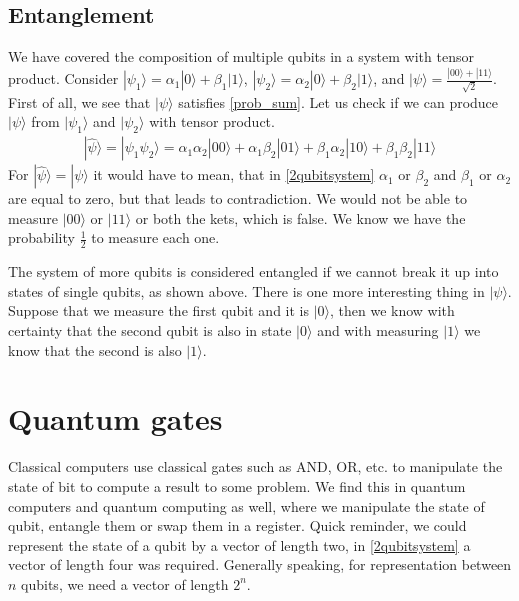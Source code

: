 \subsection{Entanglement}
We have covered the composition of multiple qubits in a system with tensor product. Consider $|\psi_1\rangle = \alpha_1 |0\rangle +\beta_1 |1\rangle$, $ |\psi_2\rangle = \alpha_2 |0\rangle +\beta_2 |1\rangle$, and $|\psi \rangle = \frac{|00 \rangle + |11 \rangle }{\sqrt{2}} $. First of all, we see that $| \psi \rangle$ satisfies \ref{prob_sum}. Let us check if we can produce $| \psi \rangle$ from $| \psi_1 \rangle$ and $| \psi_2 \rangle$ with tensor product.
\begin{equation} \label{2qubitsystem}
  \begin{aligned}
    |\widehat{\psi}\rangle = |\psi_1 \psi_2 \rangle = 
    \alpha_1 \alpha_2 |00\rangle +
    \alpha_1 \beta_2 |01\rangle +
    \beta_1 \alpha_2 |10\rangle +
    \beta_1 \beta_2 |11\rangle
    \end{aligned}
\end{equation}
For $|\widehat{\psi}\rangle = |\psi\rangle$ it would have to mean, that in \ref{2qubitsystem} $\alpha_1$ or $\beta_2$ and $\beta_1$ or $\alpha_2$ are equal to zero, but that leads to contradiction. We would not be able to measure $|00\rangle$ or $|11\rangle$ or both the kets, which is false. We know we have the probability $\frac{1}{2}$ to measure each one. 

The system of more qubits is considered entangled if we cannot break it up into states of single qubits, as shown above. There is one more interesting thing in $| \psi \rangle$. Suppose that we measure the first qubit and it is $|0\rangle$, then we know with certainty that the second qubit is also in state $|0\rangle$ and with measuring $|1\rangle$ we know that the second is also $|1\rangle$. 

\section{Quantum gates}

Classical computers use classical gates such as AND, OR, etc. to manipulate the state of bit to compute a result to some problem. We find this in quantum computers and quantum computing as well, where we manipulate the state of qubit, entangle them or swap them in a register. 
Quick reminder, we could represent the state of a qubit by a vector of length two, in \ref{2qubitsystem} a vector of length four was required. Generally speaking, for representation between $n$ qubits, we need a vector of length $2^n$.

